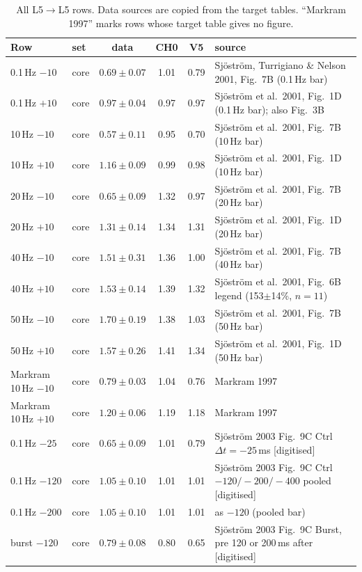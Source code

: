 \documentclass[11pt]{article}
\begin{document}
\begin{table}[p]
\centering
\scriptsize
\caption{All L5$\to$L5 rows. Data sources are copied from the target tables. ``Markram 1997'' marks rows whose
target table gives no figure.}
\label{tab:rows}
\begin{tabular}{l l c c c >{\raggedright\arraybackslash}p{6.3cm}}
\toprule
Row & set & data & CH0 & V5 & source \\
\midrule
0.1\,Hz $-10$ & core & $0.69\pm0.07$ & 1.01 & 0.79 & Sj\"ostr\"om, Turrigiano \& Nelson 2001, Fig.~7B (0.1\,Hz bar) \\
0.1\,Hz $+10$ & core & $0.97\pm0.04$ & 0.97 & 0.97 & Sj\"ostr\"om et al.\ 2001, Fig.~1D (0.1\,Hz bar); also Fig.~3B \\
10\,Hz $-10$ & core & $0.57\pm0.11$ & 0.95 & 0.70 & Sj\"ostr\"om et al.\ 2001, Fig.~7B (10\,Hz bar) \\
10\,Hz $+10$ & core & $1.16\pm0.09$ & 0.99 & 0.98 & Sj\"ostr\"om et al.\ 2001, Fig.~1D (10\,Hz bar) \\
20\,Hz $-10$ & core & $0.65\pm0.09$ & 1.32 & 0.97 & Sj\"ostr\"om et al.\ 2001, Fig.~7B (20\,Hz bar) \\
20\,Hz $+10$ & core & $1.31\pm0.14$ & 1.34 & 1.31 & Sj\"ostr\"om et al.\ 2001, Fig.~1D (20\,Hz bar) \\
40\,Hz $-10$ & core & $1.51\pm0.31$ & 1.36 & 1.00 & Sj\"ostr\"om et al.\ 2001, Fig.~7B (40\,Hz bar) \\
40\,Hz $+10$ & core & $1.53\pm0.14$ & 1.39 & 1.32 & Sj\"ostr\"om et al.\ 2001, Fig.~6B legend (153$\pm$14\%, $n=11$) \\
50\,Hz $-10$ & core & $1.70\pm0.19$ & 1.38 & 1.03 & Sj\"ostr\"om et al.\ 2001, Fig.~7B (50\,Hz bar) \\
50\,Hz $+10$ & core & $1.57\pm0.26$ & 1.41 & 1.34 & Sj\"ostr\"om et al.\ 2001, Fig.~1D (50\,Hz bar) \\
Markram 10\,Hz $-10$ & core & $0.79\pm0.03$ & 1.04 & 0.76 & Markram 1997 \\
Markram 10\,Hz $+10$ & core & $1.20\pm0.06$ & 1.19 & 1.18 & Markram 1997 \\
0.1\,Hz $-25$ & core & $0.65\pm0.09$ & 1.01 & 0.79 & Sj\"ostr\"om 2003 Fig.~9C Ctrl $\Delta t=-25$\,ms [digitised] \\
0.1\,Hz $-120$ & core & $1.05\pm0.10$ & 1.01 & 1.01 & Sj\"ostr\"om 2003 Fig.~9C Ctrl $-120/-200/-400$ pooled [digitised] \\
0.1\,Hz $-200$ & core & $1.05\pm0.10$ & 1.01 & 1.01 & as $-120$ (pooled bar) \\
burst $-120$ & core & $0.79\pm0.08$ & 0.80 & 0.65 & Sj\"ostr\"om 2003 Fig.~9C Burst, pre 120 or 200\,ms after [digitised] \\

\end{tabular}
\end{table}
\end{document}
